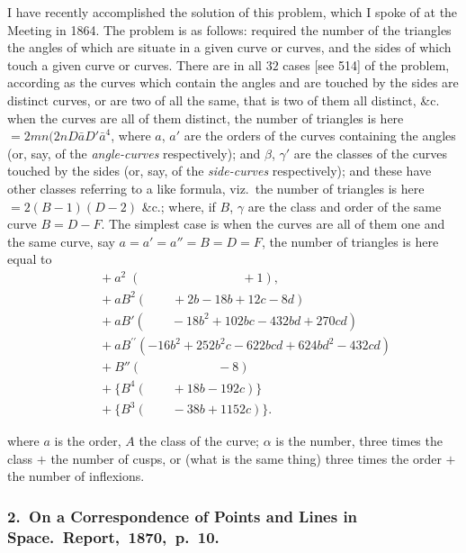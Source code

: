 \documentclass[11pt,a4paper]{book}
\begin{document}
I have recently accomplished the solution of this problem, which I spoke of at
the Meeting in 1864.  The problem is as follows: required the number of the triangles
the angles of which are situate in a given curve or curves, and the sides of which
touch a given curve or curves.  There are in all $32$ cases [see 514] of the problem,
according as the curves which contain the angles and are touched by the sides are
distinct curves, or are two of all the same, that is two of them all distinct, \&c.
when the curves are all of them distinct, the number of triangles is here $= 2mn(2nD\bar{a}D'\bar{a}^4$,
where $a$, $a'$ are the orders of the curves containing the angles (or, say, of the
\textit{angle-curves} respectively); and $\beta$, $\gamma'$ are the classes of the curves touched by the
sides (or, say, of the \textit{side-curves} respectively); and these have other classes referring to
a like formula, viz.\ the number of triangles is here $= 2(B - 1)(D - 2)$ \&c.; where,
if $B$, $\gamma$ are the class and order of the same curve $B = D - F$.  The simplest case is when the curves are all of them one and the same curve, say $a = a' = a'' = B = D = F$,
the number of triangles is here equal to
\begin{align*}
&\quad +a^2\;( \qquad\qquad\qquad\qquad +1), \\
&\quad +a B^2( \qquad +2b - 18b + 12c - 8d ) \\
&\quad +a B'( \qquad -18b^2 + 102bc - 432bd + 270cd ) \\
&\quad +a B^{\prime\prime}( -16b^2 + 252b^2 c - 622bcd + 624bd^2 - 432cd ) \\
&\quad +B''( \qquad \qquad\qquad -8 ) \\
&\quad +\{B^4( \qquad +18b - 192c )\} \\
&\quad +\{B^3( \qquad -38b + 1152c )\}.
\end{align*}

\clearpage

\noindent
where $a$ is the order, $A$ the class of the curve; $\alpha$ is the number, three times the
class $+$ the number of cusps, or (what is the same thing) three times the order $+$ the
number of inflexions.

\subsubsection*{2.\ On a Correspondence of Points and Lines in Space.\ Report,\ 1870,\ p.\ 10.}
\end{document}
